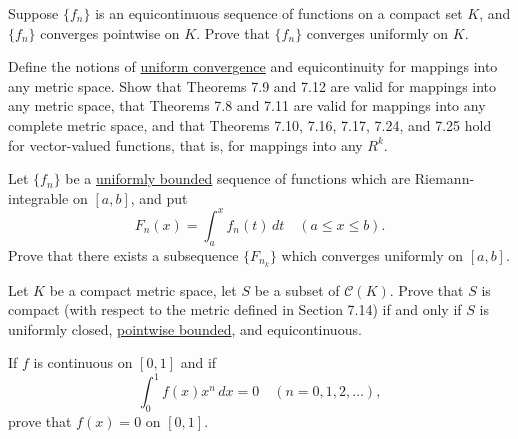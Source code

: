   \begin{exercise}[Rudin 7.16]
    Suppose $\{f_n\}$ is an equicontinuous sequence of functions on a compact set $K$, and $\{f_n\}$ converges pointwise on $K$. Prove that $\{f_n\}$ converges uniformly on $K$.
  \end{exercise}
  \begin{solution}

  \end{solution}

  \begin{exercise}[Rudin 7.17]
    Define the notions of \hyperref[def:uniform-convergence]{uniform convergence} and equicontinuity for mappings into any metric space. Show that Theorems 7.9 and 7.12 are valid for mappings into any metric space, that Theorems 7.8 and 7.11 are valid for mappings into any complete metric space, and that Theorems 7.10, 7.16, 7.17, 7.24, and 7.25 hold for vector-valued functions, that is, for mappings into any $R^k$.
  \end{exercise}
  \begin{solution}

  \end{solution}

  \begin{exercise}[Rudin 7.18]
    Let $\{f_n\}$ be a \hyperref[def:uniformly-bounded]{uniformly bounded} sequence of functions which are Riemann-integrable on $[a, b]$, and put
    \begin{equation}
      F_n(x) = \int_a^x f_n(t) \, dt \quad (a \le x \le b).
    \end{equation}
    Prove that there exists a subsequence $\{F_{n_k}\}$ which converges uniformly on $[a, b]$.
  \end{exercise}
  \begin{solution}

  \end{solution}

  \begin{exercise}[Rudin 7.19]
    Let $K$ be a compact metric space, let $S$ be a subset of $\mathscr{C}(K)$. Prove that $S$ is compact (with respect to the metric defined in Section 7.14) if and only if $S$ is uniformly closed, \hyperref[def:pointwise-bounded]{pointwise bounded}, and equicontinuous.
  \end{exercise}
  \begin{solution}

  \end{solution}

  \begin{exercise}[Rudin 7.20]
    If $f$ is continuous on $[0, 1]$ and if
    \begin{equation}
      \int_0^1 f(x) x^n \, dx = 0 \quad (n = 0, 1, 2, \dots),
    \end{equation}
    prove that $f(x) = 0$ on $[0, 1]$.
  \end{exercise}
  \begin{solution}

  \end{solution}

